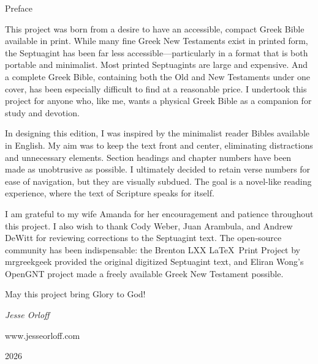 \cleardoublepage
\thispagestyle{empty}
\begin{center}
  \textcolor{bookheadingcolor}{\Huge Preface}\par
\end{center}
\vspace{2em}

This project was born from a desire to have an accessible, compact Greek Bible available in
print. While many fine Greek New Testaments exist in printed form, the Septuagint has been far
less accessible---particularly in a format that is both portable and minimalist. Most printed
Septuagints are large and expensive. And a complete Greek Bible, containing both the Old and New
Testaments under one cover, has been especially difficult to find at a reasonable price. I
undertook this project for anyone who, like me, wants a physical Greek Bible as a companion for
study and devotion.

In designing this edition, I was inspired by the minimalist reader Bibles available in English.
My aim was to keep the text front and center, eliminating distractions and unnecessary elements.
Section headings and chapter numbers have been made as unobtrusive as possible. I ultimately
decided to retain verse numbers for ease of navigation, but they are visually subdued. The goal
is a novel-like reading experience, where the text of Scripture speaks for itself.

I am grateful to my wife Amanda for her encouragement and patience throughout this project. I 
also wish to thank Cody Weber, Juan Arambula, and Andrew DeWitt for reviewing corrections to 
the Septuagint text. The open-source community has been indispensable: the Brenton LXX \LaTeX\ 
Print Project by mrgreekgeek provided the original digitized Septuagint text, and Eliran Wong's 
OpenGNT project made a freely available Greek New Testament possible.

May this project bring Glory to God!

\vfill
\begin{flushright}
  {\large\textit{Jesse Orloff}\par}
  {\large www.jesseorloff.com\par}
  {\large 2026\par}
\end{flushright}
